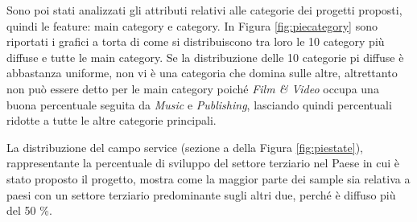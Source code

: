 \begin{figure}%
	\centering
	\qquad
	\caption{}%
	\label{fig:countrygdp}%
\end{figure}

Sono poi stati analizzati gli attributi relativi alle categorie dei progetti proposti, quindi le feature: main category e category. 
In Figura \ref{fig:piecategory} sono riportati i grafici a torta di come si distribuiscono tra loro le 10 category più diffuse e tutte le main category.
Se la distribuzione delle 10 categorie pi diffuse è abbastanza uniforme, non vi è una categoria che domina sulle altre, altrettanto non può essere detto per le main category poiché \textit{Film \& Video}
occupa una buona percentuale seguita da \textit{Music} e \textit{Publishing}, lasciando quindi percentuali ridotte a tutte le altre categorie principali.

La distribuzione del campo service (sezione a della Figura \ref{fig:piestate}), rappresentante la percentuale di sviluppo del settore terziario nel Paese in cui è stato proposto il progetto, mostra come la maggior parte dei sample sia relativa a paesi con un settore terziario predominante sugli altri due, perché è diffuso più del 50 \%.   


